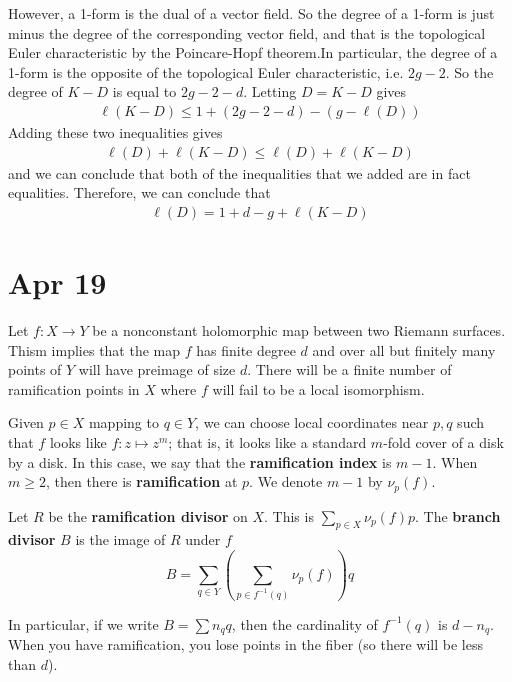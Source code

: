 \documentclass[12pt]{article}
\begin{document}
However, a 1-form is the dual of a vector field. So the degree of a 1-form is just minus the degree of the corresponding vector field, and that is the topological Euler characteristic by the Poincare-Hopf theorem.In particular, the degree of a 1-form is the opposite of the topological Euler characteristic, i.e. $2g - 2$. So the degree of $K-D$ is equal to $2g-2-d$. Letting $D = K - D$ gives \begin{align*}
    \ell(K - D) \leq 1 + (2g - 2 - d) - (g - \ell(D)) 
\end{align*} Adding these two inequalities gives \begin{align*}
    \ell(D) + \ell(K - D) \leq \ell(D) + \ell(K - D) 
\end{align*} and we can conclude that both of the inequalities that we added are in fact equalities. Therefore, we can conclude that \begin{align*}
    \ell(D) = 1 + d - g + \ell(K - D)
\end{align*} 

\section{Apr 19}
Let $f: X \to Y$ be a nonconstant holomorphic map between two Riemann surfaces. Thism implies that the map $f$ has finite degree $d$ and over all but finitely many points of $Y$ will have preimage of size $d$. There will be a finite number of ramification points in $X$ where $f$ will fail to be a local isomorphism. 
\begin{definition}

Given $p \in X$ mapping to $q \in Y$, we can choose local coordinates near $p, q$ such that $f$ looks like $f : z \mapsto z^m$; that is, it looks like a standard $m$-fold cover of a disk by a disk. In this case, we say that the \textbf{ramification index} is $m - 1$. When $m \geq 2$, then there is \textbf{ramification} at $p$. We denote $m - 1$ by $\nu_p(f)$.

\end{definition}

\begin{definition}
    
Let $R$ be the \textbf{ramification divisor} on $X$. This is $\sum_{p\in X} \nu_p(f)p$. The \textbf{branch divisor} $B$ is the image of $R$ under $f$ \[B = \sum_{q\in Y} \left(\sum_{p\in f^{-1}(q)} \nu_p(f)\right) q\]

In particular, if we write $B = \sum n_q q$, then the cardinality of $f^{-1}(q)$ is $d-n_q$. When you have ramification, you lose points in the fiber (so there will be less than $d$).

\end{definition}
\end{document}
